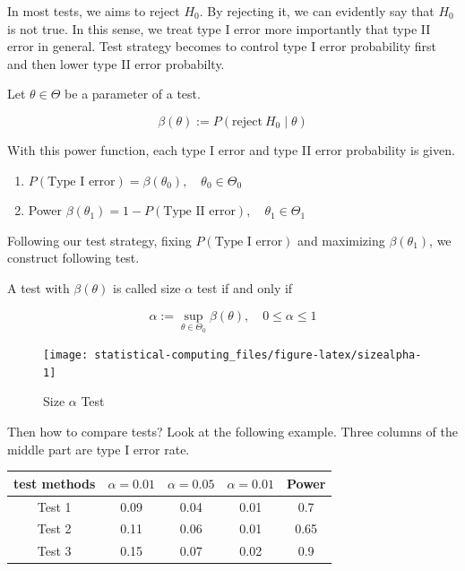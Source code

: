 \documentclass[]{book}
\theoremstyle{definition}
\theoremstyle{definition}
\theoremstyle{definition}
\theoremstyle{remark}
\let\BeginKnitrBlock\begin \let\EndKnitrBlock\end
\begin{document}
In most tests, we aims to reject \(H_0\). By rejecting it, we can evidently say that \(H_0\) is not true. In this sense, we treat type I error more importantly that type II error in general. Test strategy becomes to control type I error probability first and then lower type II error probabilty.

\BeginKnitrBlock{definition}[Power function]
\protect\hypertarget{def:bpower}{}{\label{def:bpower} {} }Let \(\theta \in \Theta\) be a parameter of a test.

\[\beta(\theta) := P(\text{reject}\: H_0 \mid \theta)\]
\EndKnitrBlock{definition}

With this power function, each type I error and type II error probability is given.

\BeginKnitrBlock{lemma}[typeerr]
\protect\hypertarget{lem:typeerr}{}{\label{lem:typeerr} {} }

\begin{enumerate}
  \item $P(\text{Type I error}) = \beta(\theta_0), \quad \theta_0 \in \Theta_0$
  \item Power $\beta(\theta_1) = 1 - P(\text{Type II error}), \quad \theta_1 \in \Theta_1$
\end{enumerate}
\EndKnitrBlock{lemma}

Following our test strategy, fixing \(P(\text{Type I error})\) and maximizing \(\beta(\theta_1)\), we construct following test.

\BeginKnitrBlock{definition}[Size $\alpha$ Test]
\protect\hypertarget{def:sizetest}{}{\label{def:sizetest} {} }A test with \(\beta(\theta)\) is called size \(\alpha\) test if and only if

\[\alpha := \sup_{\theta \in \Theta_0} \beta(\theta), \quad 0 \le \alpha \le 1\]
\EndKnitrBlock{definition}

\begin{figure}[H]

{\centering \texttt{[image: statistical-computing\_files/figure-latex/sizealpha-1]} 

}

\caption{Size $\alpha$ Test}\label{fig:sizealpha}
\end{figure}

Then how to compare tests? Look at the following example. Three columns of the middle part are type I error rate.

\begin{longtable}[]{@{}ccccc@{}}
\toprule
test methods & \(\alpha = 0.01\) & \(\alpha = 0.05\) & \(\alpha = 0.01\) & Power\tabularnewline
\midrule
\endhead
Test 1 & 0.09 & 0.04 & 0.01 & 0.7\tabularnewline
Test 2 & 0.11 & 0.06 & 0.01 & 0.65\tabularnewline
Test 3 & 0.15 & 0.07 & 0.02 & 0.9\tabularnewline
\bottomrule
\end{longtable}
\end{document}
